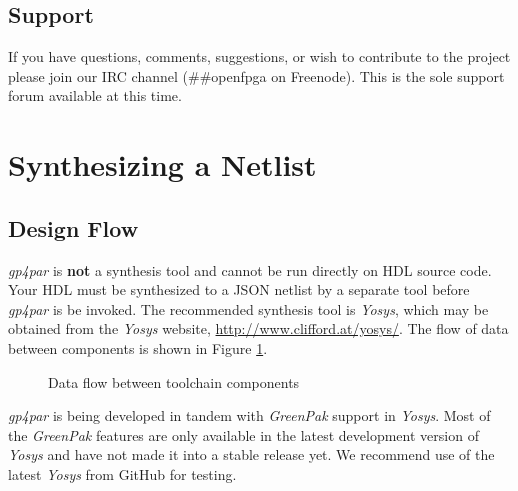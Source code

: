 \documentclass[11pt]{article}
\renewcommand\emph\textbf
\newcommand{\namestyle}[1]{\textit{#1}}
\begin{document}
\subsection{Support}

If you have questions, comments, suggestions, or wish to contribute to the project please join our IRC channel 
(\#\#openfpga on Freenode). This is the sole support forum available at this time.

\pagebreak
\section{Synthesizing a Netlist}

\subsection{Design Flow}

\namestyle{gp4par} is \emph{not} a synthesis tool and cannot be run directly on HDL source code. Your HDL must be
synthesized to a JSON netlist by a separate tool before \namestyle{gp4par} is be invoked. The recommended synthesis
tool is \namestyle{Yosys}, which may be obtained from the \namestyle{Yosys} website,
\mbox{\url{http://www.clifford.at/yosys/}}. The flow of data between components is shown in Figure \ref{flow}.

\begin{figure}[h]
\centering


\caption{Data flow between toolchain components}
\label{flow}
\end{figure}

\namestyle{gp4par} is being developed in tandem with \namestyle{GreenPak} support in \namestyle{Yosys}. Most of the
\namestyle{GreenPak} features are only available in the latest development version of \namestyle{Yosys} and have not
made it into a stable release yet. We recommend use of the latest \namestyle{Yosys} from GitHub for testing.
\end{document}
